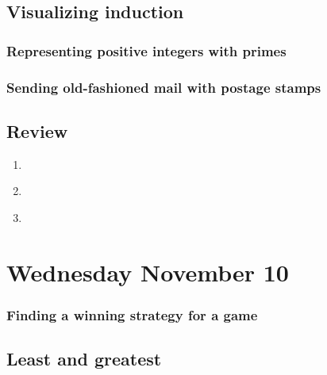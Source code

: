 \documentclass[12pt, oneside]{article}
\begin{document}
\subsection*{Visualizing induction}



\newpage


\subsubsection*{Representing positive integers with primes}

\subsubsection*{Sending old-fashioned mail with postage stamps}

\newpage
\subsection*{Review}
\begin{enumerate}
    \item \hspace{1in} \\ 
    \item \hspace{1in}\\ 
    \newpage
    \item 
\end{enumerate}

\newpage
\section*{Wednesday November 10}

\subsubsection*{Finding a winning strategy for a game}

\newpage

\subsection*{Least and greatest}

\end{document}
